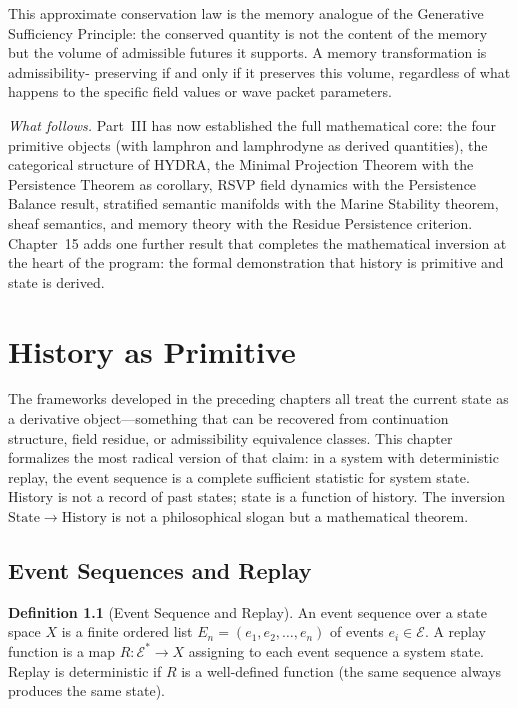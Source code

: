 \documentclass[12pt, oneside]{book}
\theoremstyle{flyxion}
\theoremstyle{definition}
\newtheorem{definition}[theorem]{Definition}
\begin{document}
This approximate conservation law is the memory
analogue of the Generative Sufficiency Principle:
the conserved quantity is not the content of the
memory but the volume of admissible futures it
supports. A memory transformation is admissibility-
preserving if and only if it preserves this volume,
regardless of what happens to the specific field
values or wave packet parameters.

\bigskip
\noindent\emph{What follows.} Part~III has now
established the full mathematical core: the four
primitive objects (with lamphron and lamphrodyne as
derived quantities), the categorical structure of
HYDRA, the Minimal Projection Theorem with the
Persistence Theorem as corollary, RSVP field dynamics
with the Persistence Balance result, stratified semantic
manifolds with the Marine Stability theorem, sheaf
semantics, and memory theory with the Residue Persistence
criterion. Chapter~15 adds one further result that
completes the mathematical inversion at the heart of the
program: the formal demonstration that history is
primitive and state is derived.

\chapter{History as Primitive}

The frameworks developed in the preceding chapters all
treat the current state as a derivative object---something
that can be recovered from continuation structure, field
residue, or admissibility equivalence classes. This chapter
formalizes the most radical version of that claim: in a
system with deterministic replay, the event sequence is a
complete sufficient statistic for system state. History is
not a record of past states; state is a function of history.
The inversion $\mathrm{State} \to \mathrm{History}$ is
not a philosophical slogan but a mathematical theorem.

\section{Event Sequences and Replay}

\begin{definition}[Event Sequence and Replay]
An event sequence over a state space $X$ is a finite
ordered list $E_n = (e_1, e_2, \ldots, e_n)$ of events
$e_i \in \mathcal{E}$. A replay function is a map
$R : \mathcal{E}^* \to X$ assigning to each event sequence
a system state. Replay is deterministic if $R$ is a
well-defined function (the same sequence always produces
the same state).
\end{definition}
\end{document}
